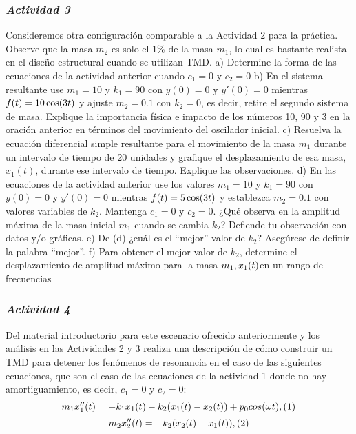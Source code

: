 \documentclass[
]{article}
\begin{document}
\hypertarget{actividad-3}{%
\subsubsection{\texorpdfstring{\emph{Actividad
3}}{Actividad 3}}\label{actividad-3}}

Consideremos otra configuración comparable a la Actividad 2 para la
práctica. Observe que la masa \(m_2\) es solo el 1\% de la masa \(m_1\),
lo cual es bastante realista en el diseño estructural cuando se utilizan
TMD. a) Determine la forma de las ecuaciones de la actividad anterior
cuando \(c_1 = 0\) y \(c_2 = 0\) b) En el sistema resultante use
\(m_1 = 10\) y \(k_1 = 90\) con \(y(0) = 0\) y \(y'(0) = 0\) mientras
\(f(t) =10 \space\space \cos (3t)\) y ajuste \(m_2 = 0.1\) con
\(k_2 = 0\), es decir, retire el segundo sistema de masa. Explique la
importancia física e impacto de los números 10, 90 y 3 en la oración
anterior en términos del movimiento del oscilador inicial. c) Resuelva
la ecuación diferencial simple resultante para el movimiento de la masa
\(m_1\) durante un intervalo de tiempo de 20 unidades y grafique el
desplazamiento de esa masa, \(x_1 (t)\), durante ese intervalo de
tiempo. Explique las observaciones. d) En las ecuaciones de la actividad
anterior use los valores \(m_1=10\) y \(k_1=90\) con \(y(0)=0\) y
\(y'(0)=0\) mientras \(f(t)=5 \space\space \cos (3t)\) y establezca
\(m_2=0.1\) con valores variables de \(k_2\). Mantenga \(c_1=0\) y
\(c_2=0\). ¿Qué observa en la amplitud máxima de la masa inicial \(m_1\)
cuando se cambia \(k_2\)? Defiende tu observación con datos y/o
gráficas. e) De (d) ¿cuál es el ``mejor'' valor de \(k_2\)? Asegúrese de
definir la palabra ``mejor''. f) Para obtener el mejor valor de \(k_2\),
determine el desplazamiento de amplitud máximo para la masa
\(m_1 ,\space\space x_1 (t)\)en un rango de frecuencias

\hypertarget{actividad-4}{%
\subsubsection{\texorpdfstring{\emph{Actividad
4}}{Actividad 4}}\label{actividad-4}}

Del material introductorio para este escenario ofrecido anteriormente y
los análisis en las Actividades 2 y 3 realiza una descripción de cómo
construir un TMD para detener los fenómenos de resonancia en el caso de
las siguientes ecuaciones, que son el caso de las ecuaciones de la
actividad 1 donde no hay amortiguamiento, es decir, \(c_1 = 0\) y
\(c_2 = 0\):
\[ m_1 \space x''_1(t) = -k_1 x_1(t)-k_2(x_1(t)-x_2(t))+p_0 \space cos(\omega t), \space\space\space\space (1)\]
\[ m_2 \space x''_2(t) = -k_2(x_2(t)-x_1(t)), \space\space\space\space (2) \]
\end{document}
